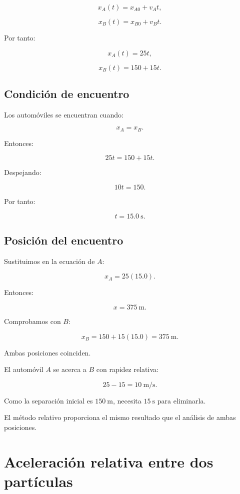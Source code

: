 \[
x_A(t)=x_{A0}+v_At,
\]

\[
x_B(t)=x_{B0}+v_Bt.
\]

Por tanto:

\[
x_A(t)=25t,
\]

\[
x_B(t)=150+15t.
\]

\subsection*{Condición de encuentro}

Los automóviles se encuentran cuando:

\[
x_A=x_B.
\]

Entonces:

\[
25t=150+15t.
\]

Despejando:

\[
10t=150.
\]

Por tanto:

\[
\boxed{
t=\SI{15.0}{\second}
}.
\]

\subsection*{Posición del encuentro}

Sustituimos en la ecuación de \(A\):

\[
x_A=25(15.0).
\]

Entonces:

\[
\boxed{
x=\SI{375}{\meter}
}.
\]

Comprobamos con \(B\):

\[
x_B=150+15(15.0)=\SI{375}{\meter}.
\]

Ambas posiciones coinciden.

\begin{interpretacion}

El automóvil \(A\) se acerca a \(B\) con rapidez relativa:

\[
25-15=\SI{10}{\meter\per\second}.
\]

Como la separación inicial es \(\SI{150}{\meter}\),
necesita \(\SI{15}{\second}\) para eliminarla.

El método relativo proporciona el mismo resultado que
el análisis de ambas posiciones.

\end{interpretacion}


\section{Aceleración relativa entre dos partículas}

